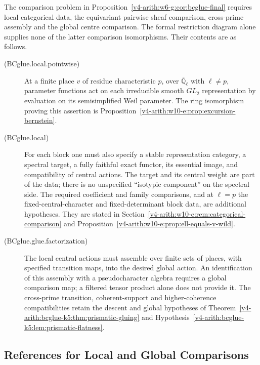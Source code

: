 The comparison problem in Proposition~\ref{v4-arith:w6-g:cor:bcglue-final}
requires local categorical data, the equivariant pairwise sheaf
comparison, cross-prime assembly and the global centre comparison.
The formal restriction diagram alone supplies none of the latter
comparison isomorphisms. Their contents are as follows.
\begin{description}
\item[(BCglue.local.pointwise)] At a finite place $v$ of residue
characteristic $p$, over $\overline{\mathbb Q}_\ell$ with $\ell\neq p$,
parameter functions act on each irreducible smooth $GL_2$ representation
by evaluation on its semisimplified Weil parameter. The ring
isomorphism proving this assertion is
Proposition~\ref{v4-arith:w10-e:prop:excursion-bernstein}.
\item[(BCglue.local)] For each block one must also specify a stable
representation category, a spectral target, a fully faithful exact
functor, its essential image, and compatibility of central actions.
The target and its central weight are part of the data; there is no
unspecified ``isotypic component'' on the spectral side.
The required coefficient and family comparisons, and at $\ell=p$
the fixed-central-character and fixed-determinant block data, are
additional hypotheses. They are stated in
Section~\ref{v4-arith:w10-e:rem:categorical-comparison} and
Proposition~\ref{v4-arith:w10-e:prop:ell-equals-v-wild}.
\item[(BCglue.glue.factorization)] The local central actions must
assemble over finite sets of places, with specified transition maps,
into the desired global action. An identification of this assembly
with a pseudocharacter algebra requires a global comparison map;
a filtered tensor product alone does not provide it. The cross-prime
transition, coherent-support and higher-coherence compatibilities
retain the descent and global hypotheses of
Theorem~\ref{v4-arith:bcglue-k5:thm:prismatic-gluing} and
Hypothesis~\ref{v4-arith:bcglue-k5:lem:prismatic-flatness}.
\end{description}

\subsection{References for Local and Global Comparisons}


